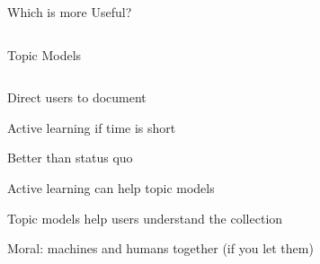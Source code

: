 \documentclass[compress]{beamer}
\newcommand{\fsi}[2]{
\begin{frame}[plain]
\vspace*{-1pt}
\makebox[\linewidth]{\texttt{[image: \#1]}}
\begin{center}
#2
\end{center}
\end{frame}
}
\begin{document}
\begin{frame}{Which is more Useful?}
{\begin{columns}
\begin{block}{Topic Models}
    \end{block}


\end{columns}
}

\end{frame}

\fsi{interactive_topic_models/alto_interface}{}
\fsi{interactive_topic_models/alto_interface_highlight}{Direct users
  to document}



\fsi{interactive_topic_models/alto/user_talk_1}{ Active learning if time is short}
\fsi{interactive_topic_models/alto/user_talk_2}{ Better than status quo}
\fsi{interactive_topic_models/alto/user_talk_3}{ Active learning can
  help topic models }
\fsi{interactive_topic_models/alto/user_talk_4}{ Topic models help
  users understand the collection }
\fsi{interactive_topic_models/alto/user_talk_4}{ Moral: machines and
  humans together (if you let them) }
\end{document}
